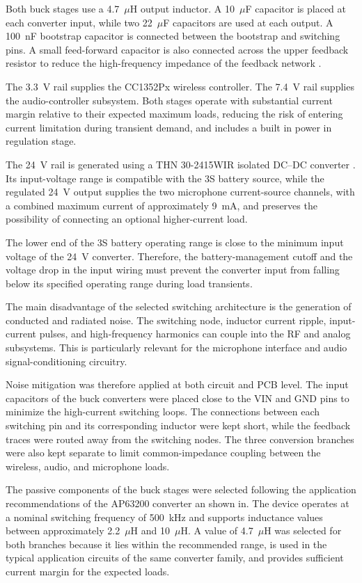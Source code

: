 Both buck stages use a 4.7~$\mu$H output inductor. A 10~$\mu$F capacitor is placed at each converter input, while two 22~$\mu$F capacitors are used at each output. A 100~nF bootstrap capacitor is connected between the bootstrap and switching pins. A small feed-forward capacitor is also connected across the upper feedback resistor to reduce the high-frequency impedance of the feedback network \cite{AP63}.

The 3.3~V rail supplies the CC1352Px wireless controller. The 7.4~V rail supplies the audio-controller subsystem. Both stages operate with substantial current margin relative to their expected maximum loads, reducing the risk of entering current limitation during transient demand, and includes a built in power in regulation stage.

The 24~V rail is generated using a THN 30-2415WIR isolated DC--DC converter \cite{TracoTHN30WIR}. Its input-voltage range is compatible with the 3S battery source, while the regulated 24~V output supplies the two microphone current-source channels, with a combined maximum current of approximately 9~mA, and preserves the possibility of connecting an optional higher-current load.

The lower end of the 3S battery operating range is close to the minimum input voltage of the 24~V converter. Therefore, the battery-management cutoff and the voltage drop in the input wiring must prevent the converter input from falling below its specified operating range during load transients.

The main disadvantage of the selected switching architecture is the generation of conducted and radiated noise. The switching node, inductor current ripple, input-current pulses, and high-frequency harmonics can couple into the RF and analog subsystems. This is particularly relevant for the microphone interface and audio signal-conditioning circuitry.

Noise mitigation was therefore applied at both circuit and PCB level. The input capacitors of the buck converters were placed close to the VIN and GND pins to minimize the high-current switching loops. The connections between each switching pin and its corresponding inductor were kept short, while the feedback traces were routed away from the switching nodes. The three conversion branches were also kept separate to limit common-impedance coupling between the wireless, audio, and microphone loads.

The passive components of the buck stages were selected following the application recommendations of the AP63200 converter an shown in. The device operates at a nominal switching frequency of 500~kHz and supports inductance values between approximately 2.2~$\mu$H and 10~$\mu$H. A value of 4.7~$\mu$H was selected for both branches because it lies within the recommended range, is used in the typical application circuits of the same converter family, and provides sufficient current margin for the expected loads.

